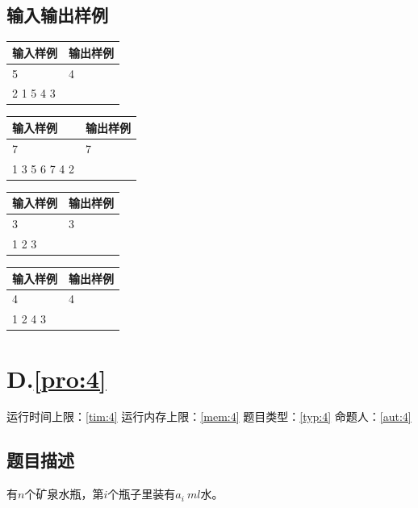 \documentclass[
	lang=cn,
	color=green
]{elegantbook}
\begin{document}
\section*{输入输出样例}
\begin{tabularx}{450pt}{X|X}
	\toprule
	输入样例  & 输出样例 \\
	\midrule
	5         & 4        \\
	2 1 5 4 3 &          \\
	\bottomrule
\end{tabularx}
\vspace{0.5cm}

\begin{tabularx}{450pt}{X|X}
	\toprule
	输入样例      & 输出样例 \\
	\midrule
	7             & 7        \\
	1 3 5 6 7 4 2 &          \\
	\bottomrule
\end{tabularx}
\vspace{0.5cm}

\begin{tabularx}{450pt}{X|X}
	\toprule
	输入样例 & 输出样例 \\
	\midrule
	3        & 3        \\
	1 2 3    &          \\
	\bottomrule
\end{tabularx}
\vspace{0.5cm}

\begin{tabularx}{450pt}{X|X}
	\toprule
	输入样例 & 输出样例 \\
	\midrule
	4        & 4        \\
	1 2 4 3  &          \\
	\bottomrule
\end{tabularx}

\newpage
\chapter*{D.\quad  \ref*{pro:4}}
\begin{center}
	运行时间上限：\ref*{tim:4} \quad 运行内存上限：\ref*{mem:4} \quad 题目类型：\ref*{typ:4} \quad 命题人：\ref*{aut:4}
\end{center}

\section*{题目描述}
有$n$个矿泉水瓶，第$i$个瓶子里装有$a_i\ ml$水。
\end{document}
